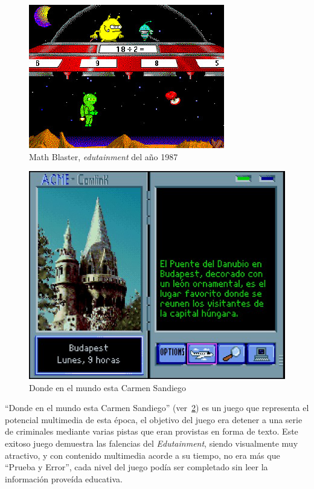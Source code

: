 \begin{figure}[ht!] 
\centering 
\includegraphics[scale=0.5,natwidth=296,natheight=217]{tics/images/math_blaster.jpg}
\caption{Math Blaster, \emph{edutainment} del año 1987}
\label{fig:math_blaster} 
\end{figure}

\begin{figure}[ht!] 
\centering 
\includegraphics[scale=0.5]{tics/images/carmen.jpg}
\caption{Donde en el mundo esta Carmen Sandiego} 
\label{fig:carmen}
\end{figure}

\enquote{Donde en el mundo esta Carmen Sandiego} (ver~\ref{fig:carmen}) es un
juego que representa el potencial multimedia de esta época, el objetivo del
juego era detener a una serie de criminales mediante varias pistas que eran
provistas en forma de texto. Este exitoso juego demuestra las falencias del
\textit{Edutainment}, siendo visualmente muy atractivo, y con contenido
multimedia acorde a su tiempo, no era más que \enquote{Prueba y Error}, cada
nivel del juego podía ser completado sin leer la información proveída
educativa\cite{charsky:2010}.

